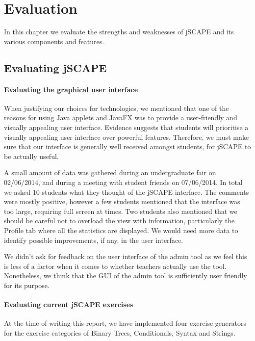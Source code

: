 \chapter{Evaluation}
\label{chap:evaluation}
In this chapter we evaluate the strengths and weaknesses of jSCAPE and its various components and features.

\section{Evaluating jSCAPE}
\subsubsection{Evaluating the graphical user interface}
When justifying our choices for technologies, we mentioned that one of the reasons for using Java applets and JavaFX was to provide a user-friendly and visually appealing user interface. Evidence\cite{Interface-study} suggests that students will prioritise a visually appealing user interface over powerful features. Therefore, we must make sure that our interface is generally well received amongst students, for jSCAPE to be actually useful.\newline

A small amount of data was gathered during an undergraduate fair on 02/06/2014, and during a meeting with student friends on 07/06/2014. In total we asked 10 students what they thought of the jSCAPE interface. The comments were mostly positive, however a few students mentioned that the interface was too large, requiring full screen at times. Two students also mentioned that we should be careful not to overload the view with information, particularly the Profile tab where all the statistics are displayed. We would need more data to identify possible improvements, if any, in the user interface. \newline

We didn't ask for feedback on the user interface of the admin tool as we feel this is less of a factor when it comes to whether teachers actually use the tool. Nonetheless, we think that the GUI of the admin tool is sufficiently user friendly for its purpose.

\subsubsection{Evaluating current jSCAPE exercises}
At the time of writing this report, we have implemented four exercise generators for the exercise categories of Binary Trees, Conditionals, Syntax and Strings.\newline

